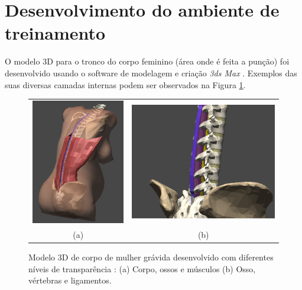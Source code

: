 \section {Desenvolvimento do ambiente de treinamento} 
\label{sec:desenvolvimentoAmbienteTreinamento}

O modelo 3D para o tronco do corpo feminino (área onde é feita a punção) foi desenvolvido usando o software de modelagem e criação \textit{3ds Max} \cite{Autodesk}. Exemplos das suas diversas camadas internas podem ser observados na Figura \ref{fig:modelo3Dcorpo}. 

\begin{figure}[ht!]
    \centering
        \begin{tabular}{cc}
        \includegraphics[width=0.4\linewidth]{capitulos/figuras/modelo corpo 3d.PNG} & 
        \includegraphics[width=0.5\linewidth]{capitulos/figuras/modelo corpo 3d - coluna vertebral, ligamentos supra, interespinhoso and flavum.PNG} 
        \\
        (a) & (b)
        \end{tabular}
    \caption{Modelo 3D de corpo de mulher grávida desenvolvido com diferentes níveis de transparência \cite{Melo2021}: (a) Corpo, ossos e músculos (b) Osso, vértebras e ligamentos.}
    \label{fig:modelo3Dcorpo}
\end{figure}

